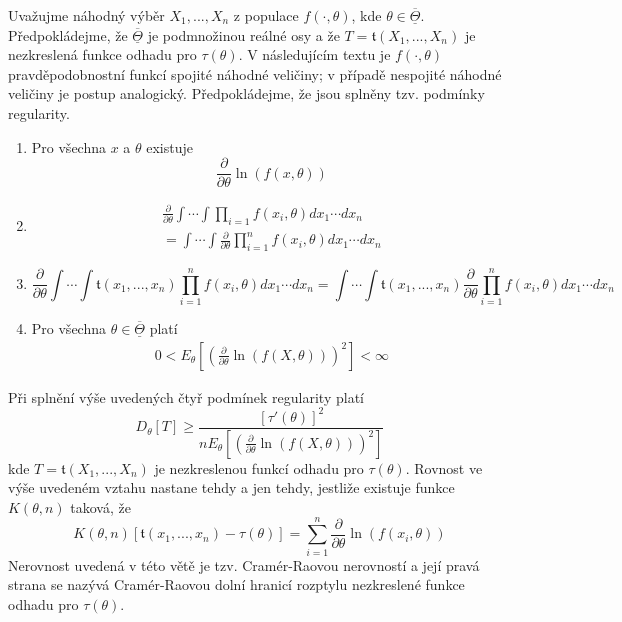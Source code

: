 Uvažujme náhodný výběr $X_1, ..., X_n$ z populace $f(\cdot, \theta)$, kde $\theta \in \overline{\underline{\Theta}}$. Předpokládejme, že $\overline{\underline{\Theta}}$ je podmnožinou reálné osy a že $T = \mathfrak{t}(X_1, ..., X_n)$ je nezkreslená funkce odhadu pro $\tau(\theta)$. V následujícím textu je $f(\cdot, \theta)$ pravděpodobnostní funkcí spojité náhodné veličiny; v případě nespojité náhodné veličiny je postup analogický. Předpokládejme, že jsou splněny tzv. podmínky regularity.
\begin{enumerate}
\item Pro všechna $x$ a $\theta$ existuje
\begin{equation*}
\frac{\partial}{\partial \theta} \ln(f(x,\theta))
\end{equation*}
\item
\begin{gather*}
\frac{\partial}{\partial \theta} \int \cdots \int \prod_{i = 1}f(x_i, \theta)dx_1 \cdots dx_n\\
= \int \cdots \int \frac{\partial}{\partial \theta} \prod_{i = 1}^n f(x_i, \theta)dx_1 \cdots dx_n
\end{gather*}
\item
\begin{equation*}
\frac{\partial}{\partial \theta} \int \cdots \int \mathfrak{t}(x_1, ..., x_n) \prod_{i = 1}^n f(x_i, \theta)dx_1 \cdots dx_n = \int \cdots \int \mathfrak{t}(x_1, ..., x_n) \frac{\partial}{\partial \theta} \prod_{i = 1}^n f(x_i, \theta)dx_1 \cdots dx_n
\end{equation*}
\item Pro všechna $\theta \in \overline{\underline{\Theta}}$ platí
\begin{gather*}
0 < E_{\theta}\left[\left(\frac{\partial}{\partial \theta} \ln(f(X, \theta))\right)^2\right] < \infty
\end{gather*}
\end{enumerate}

\begin{theorem}
Při splnění výše uvedených čtyř podmínek regularity platí
\begin{equation*}
D_{\theta}[T] \ge \frac{[\tau'(\theta)]^2}{n E_{\theta}\left[\left(\frac{\partial}{\partial \theta} \ln(f(X, \theta))\right)^2\right]}
\end{equation*}
kde $T = \mathfrak{t}(X_1, ..., X_n)$ je nezkreslenou funkcí odhadu pro $\tau(\theta)$. Rovnost ve výše uvedeném vztahu nastane tehdy a jen tehdy, jestliže existuje funkce $K(\theta, n)$ taková, že
\begin{equation*}
K(\theta, n)[\mathfrak{t}(x_1, ..., x_n) - \tau(\theta)] = \sum_{i = 1}^n \frac{\partial}{\partial \theta}\ln(f(x_i, \theta))
\end{equation*}
Nerovnost uvedená v této větě je tzv. Cramér-Raovou nerovností a její pravá strana se nazývá Cramér-Raovou dolní hranicí rozptylu nezkreslené funkce odhadu pro $\tau(\theta)$.
\end{theorem}

